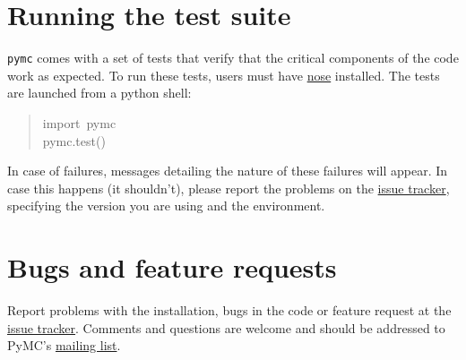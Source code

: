 
\hypertarget{running-the-test-suite}{}
\section{Running the test suite}
\label{running-the-test-suite}

\texttt{pymc} comes with a set of tests that verify that the critical components
of the code work as expected. To run these tests, users must have \href{http://somethingaboutorange.com/mrl/projects/nose/}{nose}
installed. The tests are launched from a python shell:
\begin{quote}{\ttfamily \raggedright \noindent
import~pymc~\\
pymc.test()
}\end{quote}

In case of failures, messages detailing the nature of these failures will
appear. In case this happens (it shouldn't), please report
the problems on the \href{http://code.google.com/p/pymc/issues/list.}{issue tracker}, specifying the version you are using and
the environment.



\hypertarget{bugs-and-feature-requests}{}
\section{Bugs and feature requests}
\label{bugs-and-feature-requests}

Report problems with the installation, bugs in the code or feature request at
the \href{http://code.google.com/p/pymc/issues/list.}{issue tracker}. Comments and questions are welcome and should be
addressed to PyMC's \href{mailto:pymc@googlegroups.com}{mailing list}.

